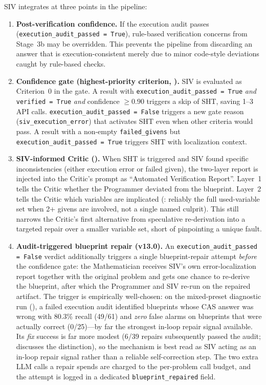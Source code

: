 \documentclass[11pt,a4paper]{article}
\begin{document}
SIV integrates at three points in the pipeline:
\begin{enumerate}[leftmargin=*,itemsep=2pt]
    \item \textbf{Post-verification confidence.} If the execution audit passes (\texttt{execution\_audit\_passed = True}), rule-based verification concerns from Stage~3b may be overridden. This prevents the pipeline from discarding an answer that is execution-consistent merely due to minor code-style deviations caught by rule-based checks.

    \item \textbf{Confidence gate (highest-priority criterion, ).}
    SIV is evaluated as Criterion~0 in the gate.
    A result with \texttt{execution\_audit\_passed = True} \emph{and} \texttt{verified = True} \emph{and} confidence $\geq 0.90$ triggers a skip of SHT, saving 1--3 API calls.
    \texttt{execution\_audit\_passed = False} triggers a new gate reason (\texttt{siv\_execution\_error}) that activates SHT even when other criteria would pass.
    A result with a non-empty \texttt{failed\_givens} but \texttt{execution\_audit\_passed = True} triggers SHT with localization context.

    \item \textbf{SIV-informed Critic ().}
    When SHT is triggered and SIV found specific inconsistencies (either execution error or failed given), the two-layer report is injected into the Critic's prompt as ``Automated Verification Report''.
    Layer~1 tells the Critic whether the Programmer deviated from the blueprint.
    Layer~2 tells the Critic which variables are implicated (: reliably the full used-variable set when 2+ givens are involved, not a single named culprit).
    This still narrows the Critic's first alternative from speculative re-derivation into a targeted repair over a smaller variable set, short of pinpointing a unique fault.

    \item \textbf{Audit-triggered blueprint repair (v13.0).}
    An \texttt{execution\_audit\_passed = False} verdict additionally triggers a single blueprint-repair attempt \emph{before} the confidence gate: the Mathematician receives SIV's own error-localization report together with the original problem and gets one chance to re-derive the blueprint, after which the Programmer and SIV re-run on the repaired artifact.
    The trigger is empirically well-chosen: on the mixed-preset diagnostic run (), a failed execution audit identified blueprints whose CAS answer was wrong with 80.3\% recall (49/61) and \emph{zero} false alarms on blueprints that were actually correct (0/25)---by far the strongest in-loop repair signal available.
    Its \emph{fix} success is far more modest (6/39 repairs subsequently passed the audit;  discusses the distinction), so the mechanism is best read as SIV acting as an in-loop repair signal rather than a reliable self-correction step.
    The two extra LLM calls a repair spends are charged to the per-problem call budget, and the attempt is logged in a dedicated \texttt{blueprint\_repaired} field.
\end{enumerate}
\end{document}
